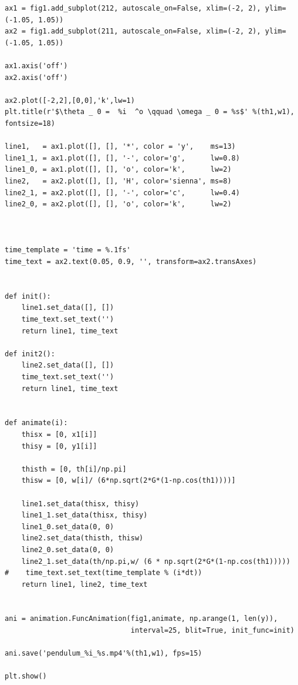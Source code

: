 \documentclass[11pt,spanish]{article}
\begin{document}
\begin{lstlisting}
ax1 = fig1.add_subplot(212, autoscale_on=False, xlim=(-2, 2), ylim=(-1.05, 1.05))
ax2 = fig1.add_subplot(211, autoscale_on=False, xlim=(-2, 2), ylim=(-1.05, 1.05))

ax1.axis('off')
ax2.axis('off')

ax2.plot([-2,2],[0,0],'k',lw=1)
plt.title(r'$\theta _ 0 =  %i  ^o \qquad \omega _ 0 = %s$' %(th1,w1), fontsize=18)

line1,   = ax1.plot([], [], '*', color = 'y',    ms=13)
line1_1, = ax1.plot([], [], '-', color='g',      lw=0.8)
line1_0, = ax1.plot([], [], 'o', color='k',      lw=2)
line2,   = ax2.plot([], [], 'H', color='sienna', ms=8)
line2_1, = ax2.plot([], [], '-', color='c',      lw=0.4)
line2_0, = ax2.plot([], [], 'o', color='k',      lw=2)



time_template = 'time = %.1fs'
time_text = ax2.text(0.05, 0.9, '', transform=ax2.transAxes)


def init():
    line1.set_data([], [])
    time_text.set_text('')
    return line1, time_text

def init2():
    line2.set_data([], [])
    time_text.set_text('')
    return line1, time_text


def animate(i):
    thisx = [0, x1[i]]
    thisy = [0, y1[i]]
    
    thisth = [0, th[i]/np.pi]
    thisw = [0, w[i]/ (6*np.sqrt(2*G*(1-np.cos(th1))))]

    line1.set_data(thisx, thisy)
    line1_1.set_data(thisx, thisy)
    line1_0.set_data(0, 0)
    line2.set_data(thisth, thisw)
    line2_0.set_data(0, 0)
    line2_1.set_data(th/np.pi,w/ (6 * np.sqrt(2*G*(1-np.cos(th1)))))
#    time_text.set_text(time_template % (i*dt))
    return line1, line2, time_text


ani = animation.FuncAnimation(fig1,animate, np.arange(1, len(y)),
                              interval=25, blit=True, init_func=init)

ani.save('pendulum_%i_%s.mp4'%(th1,w1), fps=15)

plt.show()

\end{lstlisting}
\end{document}
